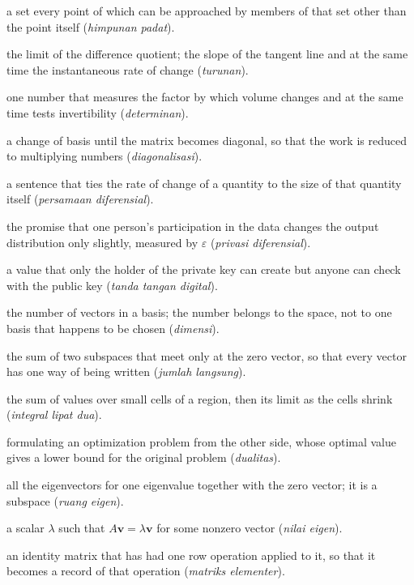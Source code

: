 \begin{description}[style=nextline,itemsep=0.35em]
  \item[Dense set] a set every point of which can be approached by members of that set other than the point itself (\emph{himpunan padat}).
  \item[Derivative] the limit of the difference quotient; the slope of the tangent line and at the same time the instantaneous rate of change (\emph{turunan}).
  \item[Determinant] one number that measures the factor by which volume changes and at the same time tests invertibility (\emph{determinan}).
  \item[Diagonalization] a change of basis until the matrix becomes diagonal, so that the work is reduced to multiplying numbers (\emph{diagonalisasi}).
  \item[Differential equation] a sentence that ties the rate of change of a quantity to the size of that quantity itself (\emph{persamaan diferensial}).
  \item[Differential privacy] the promise that one person's participation in the data changes the output distribution only slightly, measured by $\varepsilon$ (\emph{privasi diferensial}).
  \item[Digital signature] a value that only the holder of the private key can create but anyone can check with the public key (\emph{tanda tangan digital}).
  \item[Dimension] the number of vectors in a basis; the number belongs to the space, not to one basis that happens to be chosen (\emph{dimensi}).
  \item[Direct sum] the sum of two subspaces that meet only at the zero vector, so that every vector has one way of being written (\emph{jumlah langsung}).
  \item[Double integral] the sum of values over small cells of a region, then its limit as the cells shrink (\emph{integral lipat dua}).
  \item[Duality] formulating an optimization problem from the other side, whose optimal value gives a lower bound for the original problem (\emph{dualitas}).
  \item[Eigenspace] all the eigenvectors for one eigenvalue together with the zero vector; it is a subspace (\emph{ruang eigen}).
  \item[Eigenvalue] a scalar $\lambda$ such that $A\mathbf{v}=\lambda\mathbf{v}$ for some nonzero vector (\emph{nilai eigen}).
  \item[Elementary matrix] an identity matrix that has had one row operation applied to it, so that it becomes a record of that operation (\emph{matriks elementer}).

\end{description}
